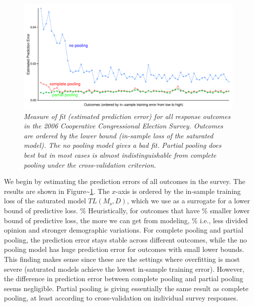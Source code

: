 \documentclass[11pt,article,oneside]{memoir}
\begin{document}
\begin{figure}
  \centering
  \includegraphics[width=.85\textwidth]{alloutcomesx1.pdf}
  \caption{\em Measure of fit (estimated prediction error) for all response outcomes
    in the 2006 Cooperative Congressional Election Survey. Outcomes are ordered by the lower bound
    (in-sample loss of the saturated model). The no pooling model
    gives a bad fit.  Partial pooling does best but in most cases is almost indistinguishable from complete pooling under the cross-validation criterion.}
  \label{fig:figx1}
\end{figure}

We begin by estimating the prediction errors of all outcomes in the
survey. The results are shown in Figure\textasciitilde{}\ref{fig:figx1}.
The \(x\)-axis is ordered by the in-sample training loss of the
saturated model \(TL(M_{\text{s}},D)\), which we use as a surrogate for
a lower bound of predictive loss. \% Heuristically, for outcomes that
have \% smaller lower bound of predictive loss, the more we can get from
modeling, \% i.e., less divided opinion and stronger demographic
variations. For complete pooling and partial pooling, the prediction
error stays stable across different outcomes, while the no pooling model
has huge prediction error for outcomes with small lower bounds. This
finding makes sense since these are the settings where overfitting is
most severe (saturated models achieve the lowest in-sample training
error). However, the difference in prediction error between complete
pooling and partial pooling seems negligible. Partial pooling is giving
essentially the same result as complete pooling, at least according to
cross-validation on individual survey responses.
\end{document}
